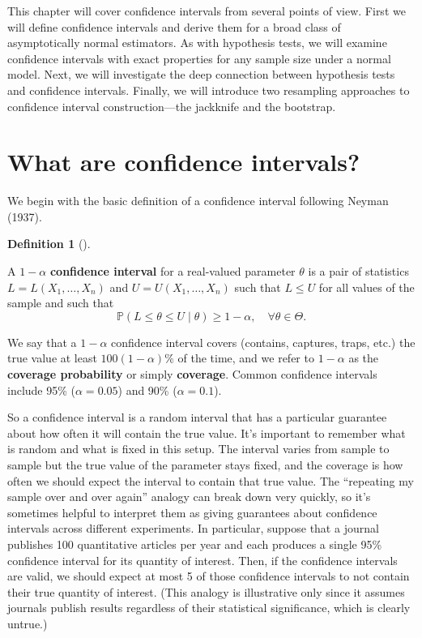 \documentclass[
  13pt,
  letterpaper,
  DIV=11,
  numbers=noendperiod]{scrreprt}
\renewcommand{\P}{\mathbb{P}}
\theoremstyle{plain}
\theoremstyle{plain}
\theoremstyle{definition}
\newtheorem{definition}{Definition}[chapter]
\theoremstyle{definition}
\theoremstyle{remark}
\begin{document}
This chapter will cover confidence intervals from several points of
view. First we will define confidence intervals and derive them for a
broad class of asymptotically normal estimators. As with hypothesis
tests, we will examine confidence intervals with exact properties for
any sample size under a normal model. Next, we will investigate the deep
connection between hypothesis tests and confidence intervals. Finally,
we will introduce two resampling approaches to confidence interval
construction---the jackknife and the bootstrap.

\section{What are confidence
intervals?}\label{what-are-confidence-intervals}

We begin with the basic definition of a confidence interval following
Neyman (1937).

\begin{definition}[]\protect\hypertarget{def-coverage}{}\label{def-coverage}

A \(1-\alpha\) \textbf{confidence interval} for a real-valued parameter
\(\theta\) is a pair of statistics \(L= L(X_1, \ldots, X_n)\) and
\(U = U(X_1, \ldots, X_n)\) such that \(L \leq U\) for all values of the
sample and such that \[ 
\P(L \leq \theta \leq U \mid \theta) \geq 1-\alpha, \quad \forall \theta \in \Theta.
\]

\end{definition}

We say that a \(1-\alpha\) confidence interval covers (contains,
captures, traps, etc.) the true value at least \(100(1-\alpha)\%\) of
the time, and we refer to \(1-\alpha\) as the \textbf{coverage
probability} or simply \textbf{coverage}. Common confidence intervals
include 95\% (\(\alpha = 0.05\)) and 90\% (\(\alpha = 0.1\)).

So a confidence interval is a random interval that has a particular
guarantee about how often it will contain the true value. It's important
to remember what is random and what is fixed in this setup. The interval
varies from sample to sample but the true value of the parameter stays
fixed, and the coverage is how often we should expect the interval to
contain that true value. The ``repeating my sample over and over again''
analogy can break down very quickly, so it's sometimes helpful to
interpret them as giving guarantees about confidence intervals across
different experiments. In particular, suppose that a journal publishes
100 quantitative articles per year and each produces a single 95\%
confidence interval for its quantity of interest. Then, if the
confidence intervals are valid, we should expect at most 5 of those
confidence intervals to not contain their true quantity of interest.
(This analogy is illustrative only since it assumes journals publish
results regardless of their statistical significance, which is clearly
untrue.)
\end{document}
